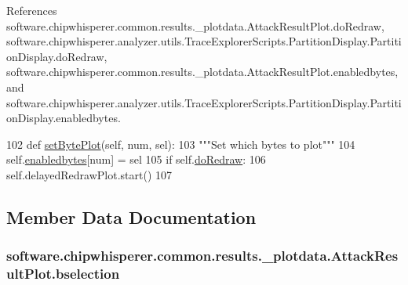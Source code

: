 References software.\+chipwhisperer.\+common.\+results.\+\_\+plotdata.\+Attack\+Result\+Plot.\+do\+Redraw, software.\+chipwhisperer.\+analyzer.\+utils.\+Trace\+Explorer\+Scripts.\+Partition\+Display.\+Partition\+Display.\+do\+Redraw, software.\+chipwhisperer.\+common.\+results.\+\_\+plotdata.\+Attack\+Result\+Plot.\+enabledbytes, and software.\+chipwhisperer.\+analyzer.\+utils.\+Trace\+Explorer\+Scripts.\+Partition\+Display.\+Partition\+Display.\+enabledbytes.


\begin{DoxyCode}
102     \textcolor{keyword}{def }\hyperlink{classsoftware_1_1chipwhisperer_1_1common_1_1results_1_1__plotdata_1_1AttackResultPlot_aecd62c0884a92e8399c0cbcfd168ed11}{setBytePlot}(self, num, sel):
103         \textcolor{stringliteral}{"""Set which bytes to plot"""}
104         self.\hyperlink{classsoftware_1_1chipwhisperer_1_1common_1_1results_1_1__plotdata_1_1AttackResultPlot_ac0d4e92a773fb657a496c5a1fc512546}{enabledbytes}[num] = sel
105         \textcolor{keywordflow}{if} self.\hyperlink{classsoftware_1_1chipwhisperer_1_1common_1_1results_1_1__plotdata_1_1AttackResultPlot_a717d22e257fa005046d2c8ec4b2d5860}{doRedraw}:
106             self.delayedRedrawPlot.start()
107 
\end{DoxyCode}


\subsection{Member Data Documentation}
\hypertarget{classsoftware_1_1chipwhisperer_1_1common_1_1results_1_1__plotdata_1_1AttackResultPlot_abaa6930969d5c07f5a724d8055a1ea7b}{}
\subsubsection[{bselection}]{\setlength{\rightskip}{0pt plus 5cm}software.\+chipwhisperer.\+common.\+results.\+\_\+plotdata.\+Attack\+Result\+Plot.\+bselection}\label{classsoftware_1_1chipwhisperer_1_1common_1_1results_1_1__plotdata_1_1AttackResultPlot_abaa6930969d5c07f5a724d8055a1ea7b}
\hypertarget{classsoftware_1_1chipwhisperer_1_1common_1_1results_1_1__plotdata_1_1AttackResultPlot_afd9b72192bfb5d8de5b5c963bff60d6d}{}
